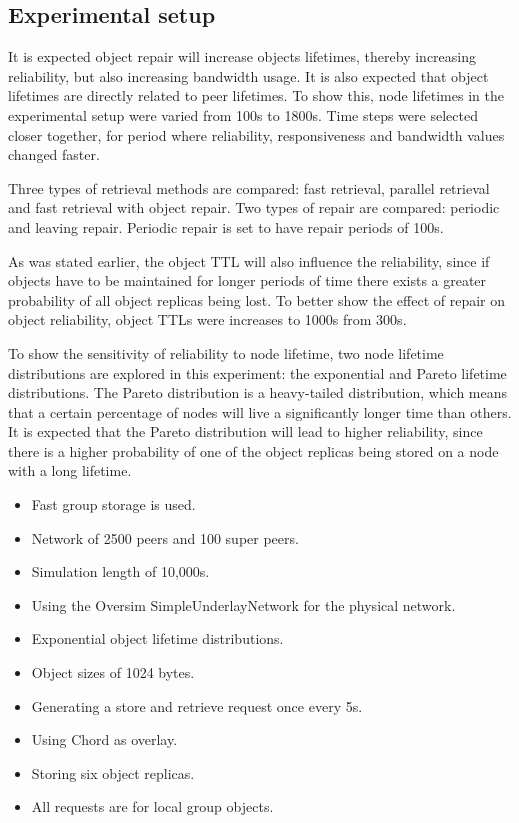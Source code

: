 \subsection{Experimental setup}

It is expected object repair will increase objects lifetimes, thereby increasing reliability, but also increasing bandwidth usage. It is also expected that object lifetimes are directly related to peer lifetimes. To show this, node lifetimes in the experimental setup were varied from 100s to 1800s. Time steps were selected closer together, for period where reliability, responsiveness and bandwidth values changed faster.

Three types of retrieval methods are compared: fast retrieval, parallel retrieval and fast retrieval with object repair. Two types of repair are compared: periodic and leaving repair. Periodic repair is set to have repair periods of 100s.

As was stated earlier, the object TTL will also influence the reliability, since if objects have to be maintained for longer periods of time there exists a greater probability of all object replicas being lost. To better show the effect of repair on object reliability, object TTLs were increases to 1000s from 300s.

To show the sensitivity of reliability to node lifetime, two node lifetime distributions are explored in this experiment: the exponential and Pareto lifetime distributions. The Pareto distribution is a heavy-tailed distribution, which means that a certain percentage of nodes will live a significantly longer time than others. It is expected that the Pareto distribution will lead to higher reliability, since there is a higher probability of one of the object replicas being stored on a node with a long lifetime.

\begin{itemize}
\item Fast group storage is used.
\item Network of 2500 peers and 100 super peers.
\item Simulation length of 10,000s.
\item Using the Oversim SimpleUnderlayNetwork for the physical network.
\item Exponential object lifetime distributions.
\item Object sizes of 1024 bytes.
\item Generating a store and retrieve request once every 5s.
\item Using Chord as overlay.
\item Storing six object replicas.
\item All requests are for local group objects.
\end{itemize}

